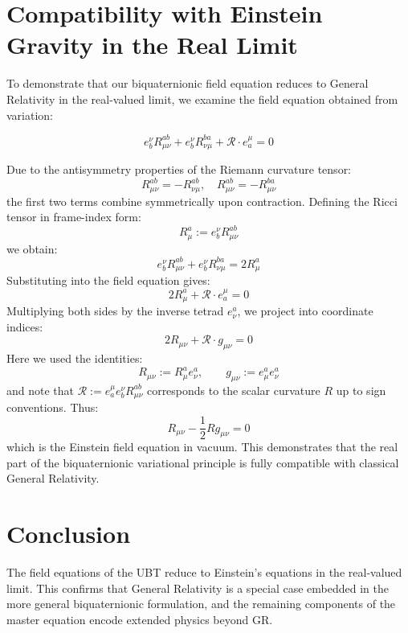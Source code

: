 \documentclass[11pt]{article}
\begin{document}
\section{Compatibility with Einstein Gravity in the Real Limit}

To demonstrate that our biquaternionic field equation reduces to General Relativity in the real-valued limit, we examine the field equation obtained from variation:

\[
e^\nu_b R_{\mu\nu}^{ab} + e^\nu_b R_{\nu\mu}^{ba} + \mathcal{R} \cdot e^\mu_a = 0
\]

Due to the antisymmetry properties of the Riemann curvature tensor:
\[
R_{\mu\nu}^{ab} = - R_{\nu\mu}^{ab}, \quad R_{\mu\nu}^{ab} = - R_{\mu\nu}^{ba}
\]
the first two terms combine symmetrically upon contraction. Defining the Ricci tensor in frame-index form:
\[
R^a_\mu := e^\nu_b R_{\mu\nu}^{ab}
\]
we obtain:
\[
e^\nu_b R_{\mu\nu}^{ab} + e^\nu_b R_{\nu\mu}^{ba} = 2 R^a_\mu
\]
Substituting into the field equation gives:
\[
2 R^a_\mu + \mathcal{R} \cdot e^\mu_a = 0
\]
Multiplying both sides by the inverse tetrad \( e^a_\nu \), we project into coordinate indices:
\[
2 R_{\mu\nu} + \mathcal{R} \cdot g_{\mu\nu} = 0
\]
Here we used the identities:
\[
R_{\mu\nu} := R^a_\mu e^a_\nu, \qquad g_{\mu\nu} := e^a_\mu e^a_\nu
\]
and note that \( \mathcal{R} := e^\mu_a e^\nu_b R_{\mu\nu}^{ab} \) corresponds to the scalar curvature \( R \) up to sign conventions. Thus:
\[
R_{\mu\nu} - \frac{1}{2} R g_{\mu\nu} = 0
\]
which is the Einstein field equation in vacuum. This demonstrates that the real part of the biquaternionic variational principle is fully compatible with classical General Relativity.


\section{Conclusion}
The field equations of the UBT reduce to Einstein's equations in the real-valued limit. This confirms that General Relativity is a special case embedded in the more general biquaternionic formulation, and the remaining components of the master equation encode extended physics beyond GR.
\end{document}
